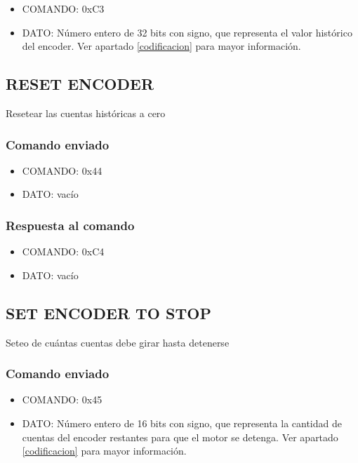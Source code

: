 \documentclass[a4paper,10pt]{article}
\begin{document}
\begin{itemize}
	\item{COMANDO:} 0xC3
	\item{DATO:} N\'umero entero de 32 bits con signo, que representa el valor hist\'orico del encoder.
		Ver apartado \ref{codificacion} para mayor informaci\'on.
\end{itemize}

\subsection{RESET ENCODER}
\label{reset_encoder}

Resetear las cuentas hist\'oricas a cero

\subsubsection*{Comando enviado}

\begin{itemize}
	\item{COMANDO:} 0x44
	\item{DATO:} vac\'io
\end{itemize}

\subsubsection*{Respuesta al comando}

\begin{itemize}
	\item{COMANDO:} 0xC4
	\item{DATO:} vac\'io
\end{itemize}

\subsection{SET ENCODER TO STOP}
\label{set_encoder_to_stop}

Seteo de cu\'antas cuentas debe girar hasta detenerse

\subsubsection*{Comando enviado}

\begin{itemize}
	\item{COMANDO:} 0x45
	\item{DATO:} N\'umero entero de 16 bits con signo, que representa la cantidad de cuentas del encoder restantes para que el motor se detenga.
		Ver apartado \ref{codificacion} para mayor informaci\'on.
\end{itemize}
\end{document}
